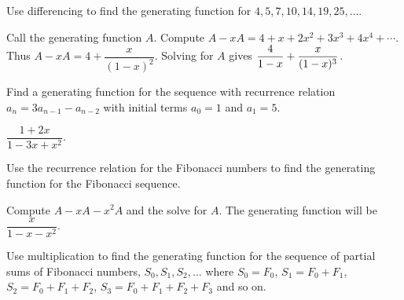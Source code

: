 \begin{questions}
\begin{answer}
	\end{answer}
	
	
	
	


\question Use differencing to find the generating function for $4, 5, 7, 10, 14, 19, 25, \ldots$.

	\begin{answer}
		Call the generating function $A$.  Compute $A - xA = 4 + x + 2x^2 + 3x^3 + 4x^4 + \cdots$.  Thus $A - xA = 4 + \dfrac{x}{(1-x)^2}$.  Solving for $A$ gives $\displaystyle\frac{4}{1-x} + \frac{x}{(1-x)^3}$.  %
	\end{answer}
	
	
	
	


\question Find a generating function for the sequence with recurrence relation $a_n = 3a_{n-1} - a_{n-2}$ with initial terms $a_0 = 1$ and $a_1 = 5$.

	\begin{answer}
		$\dfrac{1+2x}{1-3x + x^2}$.  %
	\end{answer}
	
	
	
	


\question Use the recurrence relation for the Fibonacci numbers to find the generating function for the Fibonacci sequence.

	\begin{answer}
		Compute $A - xA - x^2A$ and the solve for $A$.  The generating function will be $\dfrac{x}{1-x-x^2}$.  %
	\end{answer}
	
	
	
	


\question Use multiplication to find the generating function for the sequence of partial sums of Fibonacci numbers, $S_0, S_1, S_2, \ldots$ where $S_0 = F_0$, $S_1 = F_0 + F_1$, $S_2 = F_0 + F_1 + F_2$, $S_3 = F_0 + F_1 + F_2 + F_3$ and so on.


\end{questions}
